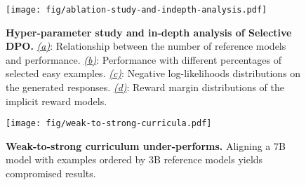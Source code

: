 \begin{figure*}
    \centering
    \texttt{[image: fig/ablation-study-and-indepth-analysis.pdf]}
    \vspace{-0.8cm}
    \caption{\textbf{Hyper-parameter study and in-depth analysis of Selective DPO.}  \underline{\textit{(a)}}: Relationship between the number of reference models and performance. \underline{\textit{(b)}}: Performance with different percentages of selected easy examples. \underline{\textit{(c)}}: Negative log-likelihoods distributions on the generated responses. \underline{\textit{(d)}}: Reward margin distributions of the implicit reward models.}
    \label{fig:ablation-and-analysis}
    \vspace{-0.4cm}
\end{figure*}
\begin{figure}
    \centering
    \texttt{[image: fig/weak-to-strong-curricula.pdf]}
    \vspace{-0.8cm}
    \caption{\textbf{Weak-to-strong curriculum under-performs.}  Aligning a 7B model with examples ordered by 3B reference models yields compromised results.}
    \label{fig:weak-to-strong-curriculum}
    \vspace{-0.4cm}
\end{figure}


